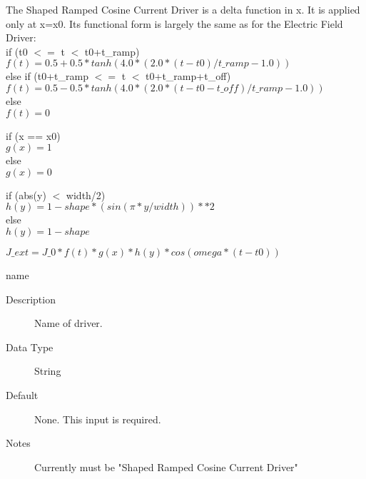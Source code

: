 \documentclass[11pt]{amsart}
\begin{document}
The Shaped Ramped Cosine Current Driver is a delta function in x.  It is
applied only at x=x0.  Its functional form is largely the same as for the
Electric Field Driver: \\
\noindent if (t0 $<=$ t $<$ t0+t\_ramp) \\
\indent \begin{math} f(t) = 0.5+0.5*tanh(4.0*(2.0*(t-t0)/t\_ramp-1.0)) \end{math} \\
else if (t0+t\_ramp $<=$ t $<$ t0+t\_ramp+t\_off) \\
\indent \begin{math} f(t) = 0.5-0.5*tanh(4.0*(2.0*(t-t0-t\_off)/t\_ramp-1.0)) \end{math} \\
else \\
\indent \begin{math} f(t) = 0 \end{math}

\noindent if (x == x0) \\
\indent \begin{math} g(x) = 1 \end{math} \\
else \\
\indent \begin{math} g(x) = 0 \end{math}

\noindent if (abs(y) $<$ width/2) \\
\indent \begin{math} h(y) = 1-shape*(sin(\pi*y/width))**2 \end{math} \\
else \\
\indent \begin{math} h(y) = 1-shape \end{math}

\noindent \begin{math} J\_ext = J\_0*f(t)*g(x)*h(y)*cos(omega*(t-t0)) \end{math}

name
\begin{description}
\item [Description] Name of driver.
\item [Data Type] String
\item [Default] None.  This input is required.
\item [Notes] Currently must be "Shaped Ramped Cosine Current Driver"
\end{description}
\end{document}

